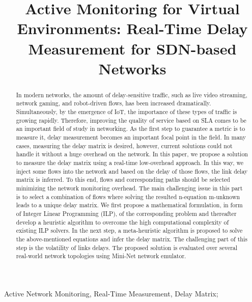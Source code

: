\documentclass[10pt, journal, letterpaper]{IEEEtran}
\begin{document}
\title{Active Monitoring for Virtual Environments: Real-Time Delay Measurement for SDN-based Networks}
\author{}
\maketitle	
\begin{abstract}
    In modern networks, the amount of delay-sensitive traffic, such as live video streaming, network gaming, and robot-driven flows, has been increased dramatically. Simultaneously, by the emergence of IoT, the importance of these types of traffic is growing rapidly. Therefore, improving the quality of service based on SLA comes to be an important field of study in networking. As the first step to guarantee a metric is to measure it, delay measurement becomes an important focal point in the field. In many cases, measuring the delay matrix is desired, however, current solutions could not handle it without a huge overhead on the network. In this paper, we propose a solution to measure the delay matrix using a real-time low-overhead approach. In this way, we inject some flows into the network and based on the delay of those flows, the link delay matrix is inferred. To this end, flows and corresponding paths should be selected minimizing the network monitoring overhead. The main challenging issue in this part is to select a combination of flows where solving the resulted n-equation m-unknown leads to a unique delay matrix. We first propose a mathematical formulation, in form of Integer Linear Programming (ILP), of the corresponding problem and thereafter develop a heuristic algorithm to overcome the high computational complexity of existing ILP solvers. In the next step, a meta-heuristic algorithm is proposed to solve the above-mentioned equations and infer the delay matrix. The challenging part of this step is the volatility of links delays. The proposed solution is evaluated over several real-world network topologies using Mini-Net network emulator.
\end{abstract}	
\begin{IEEEkeywords} 
    Active Network Monitoring, Real-Time Measurement, Delay Matrix;
\end{IEEEkeywords}
\end{document}
